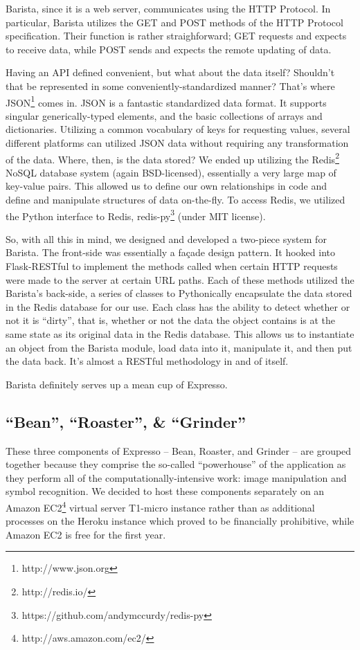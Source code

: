 \documentclass{acm_proc_article-sp}
\begin{document}
Barista, since it is a web server, communicates using the HTTP Protocol. In particular, Barista utilizes the GET and POST methods of the HTTP Protocol specification. Their function is rather straighforward; GET requests and expects to receive data, while POST sends and expects the remote updating of data. 

Having an API defined convenient, but what about the data itself? Shouldn't that be represented in some conveniently-standardized manner? That's where JSON\footnote{http://www.json.org} comes in. JSON is a fantastic standardized data format. It supports singular generically-typed elements, and the basic collections of arrays and dictionaries. Utilizing a common vocabulary of keys for requesting values, several different platforms can utilized JSON data without requiring any transformation of the data. Where, then, is the data stored? We ended up utilizing the Redis\footnote{http://redis.io/} NoSQL database system (again BSD-licensed), essentially a very large map of key-value pairs. This allowed us to define our own relationships in code and define and manipulate structures of data on-the-fly. To access Redis, we utilized the Python interface to Redis, redis-py\footnote{https://github.com/andymccurdy/redis-py} (under MIT license).

So, with all this in mind, we designed and developed a two-piece system for Barista. The front-side was essentially a fa\c{c}ade design pattern. It hooked into Flask-RESTful to implement the methods called when certain HTTP requests were made to the server at certain URL paths. Each of these methods utilized the Barista's back-side, a series of classes to Pythonically encapsulate the data stored in the Redis database for our use. Each class has the ability to detect whether or not it is ``dirty'', that is, whether or not the data the object contains is at the same state as its original data in the Redis database. This allows us to instantiate an object from the Barista module, load data into it, manipulate it, and then put the data back. It's almost a RESTful methodology in and of itself.

Barista definitely serves up a mean cup of Expresso.

\subsection{``Bean'', ``Roaster'', \& ``Grinder''}
These three components of Expresso -- Bean, Roaster, and Grinder -- are grouped together because they comprise the so-called ``powerhouse'' of the application as they perform all of the computationally-intensive work: image manipulation and symbol recognition. We decided to host these components separately on an Amazon EC2\footnote{http://aws.amazon.com/ec2/} virtual server T1-micro instance rather than as  additional processes on the Heroku instance which proved to be financially prohibitive, while Amazon EC2 is free for the first year. 
\end{document}
